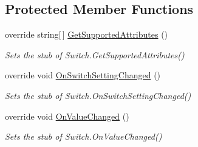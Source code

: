 \subsection*{Protected Member Functions}
\begin{DoxyCompactItemize}
\item 
override string\mbox{[}$\,$\mbox{]} \hyperlink{class_system_1_1_diagnostics_1_1_fakes_1_1_stub_switch_a3332c97e3b5c54ad3892bff9628adf6e}{Get\-Supported\-Attributes} ()
\begin{DoxyCompactList}\small\item\em Sets the stub of Switch.\-Get\-Supported\-Attributes()\end{DoxyCompactList}\item 
override void \hyperlink{class_system_1_1_diagnostics_1_1_fakes_1_1_stub_switch_a62959a683579aa0110e6e67709a1f3c6}{On\-Switch\-Setting\-Changed} ()
\begin{DoxyCompactList}\small\item\em Sets the stub of Switch.\-On\-Switch\-Setting\-Changed()\end{DoxyCompactList}\item 
override void \hyperlink{class_system_1_1_diagnostics_1_1_fakes_1_1_stub_switch_a880f811f026ebf474d3977cb35eac1f0}{On\-Value\-Changed} ()
\begin{DoxyCompactList}\small\item\em Sets the stub of Switch.\-On\-Value\-Changed()\end{DoxyCompactList}\end{DoxyCompactItemize}
